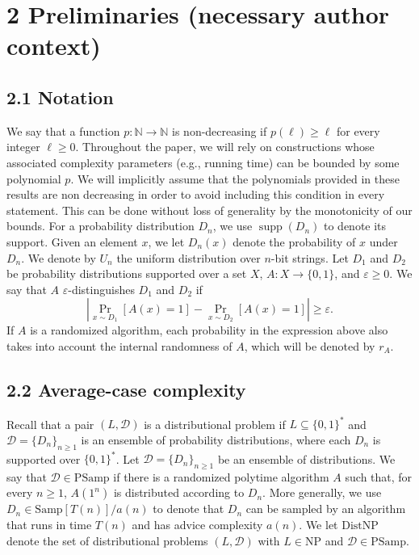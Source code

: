 \section*{2 Preliminaries (necessary author context)}
\subsection*{2.1 Notation}
We say that a function $p:\mathbb N\to\mathbb N$ is non-decreasing if $p(\ell)\geq\ell$ for every integer $\ell\geq0$. Throughout the paper, we will rely on constructions whose associated complexity parameters (e.g., running time) can be bounded by some polynomial $p$. We will implicitly assume that the polynomials provided in these results are non decreasing in order to avoid including this condition in every statement. This can be done without loss of generality by the monotonicity of our bounds.
For a probability distribution $D_n$, we use $\operatorname{supp}(D_n)$ to denote its support. Given an element $x$, we let $D_n(x)$ denote the probability of $x$ under $D_n$. We denote by $U_n$ the uniform distribution over $n$-bit strings.
Let $D_1$ and $D_2$ be probability distributions supported over a set $X$, $A:X\to\{0,1\}$, and $\varepsilon\geq0$. We say that $A$ $\varepsilon$-distinguishes $D_1$ and $D_2$ if
\[\left|\Pr_{x\sim D_1}[A(x)=1]-\Pr_{x\sim D_2}[A(x)=1]\right|\geq\varepsilon.\]
If $A$ is a randomized algorithm, each probability in the expression above also takes into account the internal randomness of $A$, which will be denoted by $r_A$.
\subsection*{2.2 Average-case complexity}
Recall that a pair $(L,\mathcal D)$ is a distributional problem if $L\subseteq\{0,1\}^*$ and $\mathcal D=\{D_n\}_{n\geq1}$ is an ensemble of probability distributions, where each $D_n$ is supported over $\{0,1\}^*$.
Let $\mathcal D=\{D_n\}_{n\geq1}$ be an ensemble of distributions. We say that $\mathcal D\in\mathrm{PSamp}$ if there is a randomized polytime algorithm $A$ such that, for every $n\geq1$, $A(1^n)$ is distributed according to $D_n$. More generally, we use $D_n\in\mathrm{Samp}[T(n)]/a(n)$ to denote that $D_n$ can be sampled by an algorithm that runs in time $T(n)$ and has advice complexity $a(n)$.
We let $\mathrm{DistNP}$ denote the set of distributional problems $(L,\mathcal D)$ with $L\in\mathrm{NP}$ and $\mathcal D\in\mathrm{PSamp}$.
